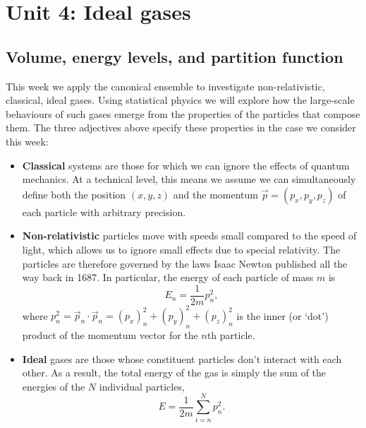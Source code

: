 \renewcommand{\thisunit}{MATH327 Unit 4}
\renewcommand{\moddate}{Last modified 17 Jan.~2022}
\setcounter{section}{4}
\setcounter{subsection}{0}
{}
\section*{Unit 4: Ideal gases}
\subsection{\label{sec:regulate}Volume, energy levels, and partition function}
This week we apply the canonical ensemble to investigate non-relativistic, classical, ideal gases.
Using statistical physics we will explore how the large-scale behaviours of such gases emerge from the properties of the particles that compose them.
The three adjectives above specify these properties in the case we consider this week: \\[-24 pt]
\begin{itemize}
  \item \textbf{Classical} systems are those for which we can ignore the effects of quantum mechanics.
        At a technical level, this means we assume we can simultaneously define both the position $(x, y, z)$ and the momentum $\vec p = (p_x, p_y, p_z)$ of each particle with arbitrary precision.
  \item \textbf{Non-relativistic} particles move with speeds small compared to the speed of light, which allows us to ignore small effects due to special relativity.
        The particles are therefore governed by the laws Isaac Newton published all the way back in 1687.
        In particular, the energy of each particle of mass $m$ is
        \begin{equation*}
          E_n = \frac{1}{2m} p_n^2,
        \end{equation*}
        where $p_n^2 = \vec p_n \cdot \vec p_n = (p_x)_n^2 + (p_y)_n^2 + (p_z)_n^2$ is the inner (or `dot') product of the momentum vector for the $n$th particle.
  \item \textbf{Ideal} gases are those whose constituent particles don't interact with each other.
        As a result, the total energy of the gas is simply the sum of the energies of the $N$ individual particles,
        \begin{equation}
          \label{eq:momentum}
          E = \frac{1}{2m} \sum_{i = n}^N p_n^2.
        \end{equation}
\end{itemize}


